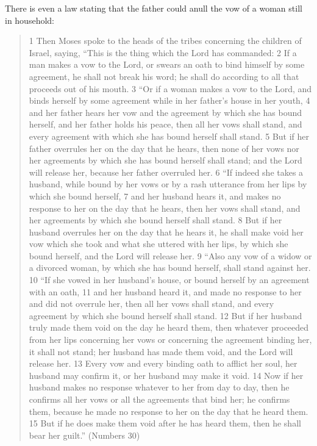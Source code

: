 \documentclass[11pt]{article}
\begin{document}
There is even a law stating that the father could anull the vow of a woman still in household:
\begin{quote}
1 Then Moses spoke to the heads of the tribes concerning the children of Israel, saying, “This is the thing which the Lord has commanded: 2 If a man makes a vow to the Lord, or swears an oath to bind himself by some agreement, he shall not break his word; he shall do according to all that proceeds out of his mouth.
3 “Or if a woman makes a vow to the Lord, and binds herself by some agreement while in her father’s house in her youth, 4 and her father hears her vow and the agreement by which she has bound herself, and her father holds his peace, then all her vows shall stand, and every agreement with which she has bound herself shall stand. 5 But if her father overrules her on the day that he hears, then none of her vows nor her agreements by which she has bound herself shall stand; and the Lord will release her, because her father overruled her.
6 “If indeed she takes a husband, while bound by her vows or by a rash utterance from her lips by which she bound herself, 7 and her husband hears it, and makes no response to her on the day that he hears, then her vows shall stand, and her agreements by which she bound herself shall stand. 8 But if her husband overrules her on the day that he hears it, he shall make void her vow which she took and what she uttered with her lips, by which she bound herself, and the Lord will release her.
9 “Also any vow of a widow or a divorced woman, by which she has bound herself, shall stand against her.
10 “If she vowed in her husband’s house, or bound herself by an agreement with an oath, 11 and her husband heard it, and made no response to her and did not overrule her, then all her vows shall stand, and every agreement by which she bound herself shall stand. 12 But if her husband truly made them void on the day he heard them, then whatever proceeded from her lips concerning her vows or concerning the agreement binding her, it shall not stand; her husband has made them void, and the Lord will release her. 13 Every vow and every binding oath to afflict her soul, her husband may confirm it, or her husband may make it void. 14 Now if her husband makes no response whatever to her from day to day, then he confirms all her vows or all the agreements that bind her; he confirms them, because he made no response to her on the day that he heard them. 15 But if he does make them void after he has heard them, then he shall bear her guilt.” (Numbers 30)
\end{quote}
\end{document}
